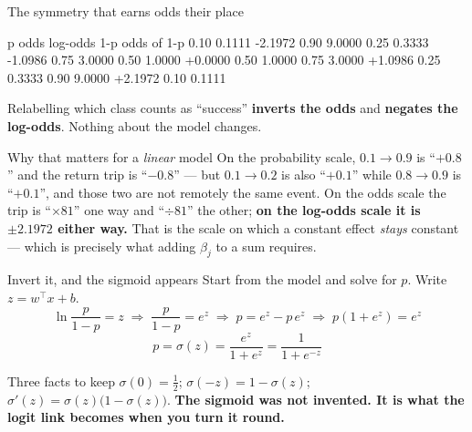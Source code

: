 \documentclass[aspectratio=169]{beamer}
\begin{document}
\begin{frame}[fragile,shrink=6]{The symmetry that earns odds their place}
\begin{outblk}
       p       odds     log-odds        1-p  odds of 1-p
    0.10     0.1111      -2.1972       0.90       9.0000
    0.25     0.3333      -1.0986       0.75       3.0000
    0.50     1.0000      +0.0000       0.50       1.0000
    0.75     3.0000      +1.0986       0.25       0.3333
    0.90     9.0000      +2.1972       0.10       0.1111
\end{outblk}
Relabelling which class counts as ``success'' \textbf{inverts the odds} and
\textbf{negates the log-odds}. Nothing about the model changes.
\begin{alertblock}{Why that matters for a \emph{linear} model}
  \footnotesize On the probability scale, $0.1 \to 0.9$ is ``$+0.8$'' and the
  return trip is ``$-0.8$'' --- but $0.1\to0.2$ is also ``$+0.1$'' while
  $0.8\to0.9$ is ``$+0.1$'', and those two are not remotely the same event.
  On the odds scale the trip is ``$\times 81$'' one way and ``$\div 81$'' the
  other; \textbf{on the log-odds scale it is $\pm 2.1972$ either way.} That is
  the scale on which a constant effect \emph{stays} constant --- which is
  precisely what adding $\beta_j$ to a sum requires.
\end{alertblock}
\end{frame}

\begin{frame}[shrink=8]{Invert it, and the sigmoid appears}
  Start from the model and solve for $p$. Write $z = w^{\!\top}x + b$.
  \[
    \ln\frac{p}{1-p} = z
    \;\Longrightarrow\;
    \frac{p}{1-p} = e^{z}
    \;\Longrightarrow\;
    p = e^{z} - p\,e^{z}
    \;\Longrightarrow\;
    p\left(1 + e^{z}\right) = e^{z}
  \]
  \[
    \boxed{\;p = \sigma(z) = \frac{e^{z}}{1+e^{z}}
             = \frac{1}{1+e^{-z}}\;}
  \]
  \begin{block}{Three facts to keep}
    \small
    $\sigma(0) = \tfrac12$; \quad
    $\sigma(-z) = 1-\sigma(z)$; \quad
    $\sigma'(z) = \sigma(z)\bigl(1-\sigma(z)\bigr)$.
    \textbf{The sigmoid was not invented. It is what the logit link becomes
    when you turn it round.}
  \end{block}
\end{frame}
\end{document}

